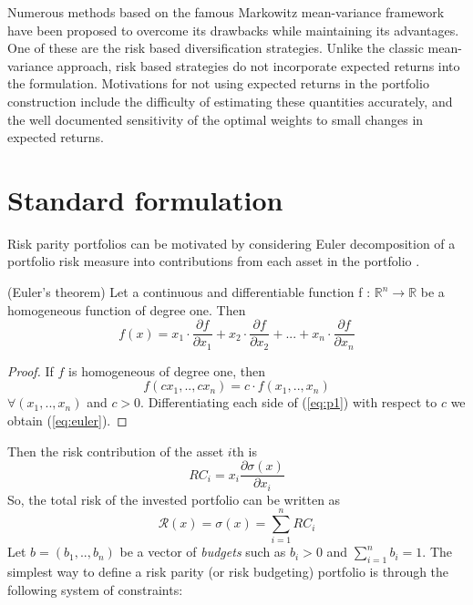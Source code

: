 Numerous methods based on the famous Markowitz mean-variance framework have been proposed to overcome its drawbacks while maintaining its advantages. One of these are the risk based diversification strategies. Unlike the classic mean-variance approach, risk based strategies do not incorporate expected returns into the formulation. Motivations for not using expected returns in the portfolio construction include the difficulty of estimating these quantities accurately, and the well documented sensitivity of the optimal weights to small changes in expected returns. 

\section{Standard formulation}
Risk parity portfolios can be motivated by considering Euler decomposition of a portfolio risk measure into contributions from each asset in the portfolio \cite{tutuncu}.
\begin{theorem}
(Euler’s theorem) Let a continuous and differentiable function f : $\mathbb{R}^n \longrightarrow \mathbb{R}$ be a homogeneous function of degree one. Then
\begin{equation}\label{eq:euler}
f(x) = x_1\cdot\frac{\partial f}{\partial x_1} + x_2\cdot\frac{\partial f}{\partial x_2} + ... + x_n\cdot\frac{\partial f}{\partial x_n}
\end{equation}
\end{theorem}
\begin{proof}
If $f$ is homogeneous of degree one, then
\begin{equation}\label{eq:p1}
f(c x_1, .., c x_n) = c \cdot f(x_1, .., x_n)
\end{equation}
$\forall (x_1, .., x_n)$  and  $c > 0$. Differentiating each side of (\ref{eq:p1}) with respect to $c$ we obtain (\ref{eq:euler}).
\end{proof}
Then the risk contribution of the asset $i$th is
\begin{equation}\label{eq:marg}
RC_i = x_i \frac{\partial \sigma(x)}{\partial x_i}
\end{equation} 
So, the total risk of the invested portfolio can be written as
\begin{equation}\label{eq:total}
\mathcal{R}(x) = \sigma(x) = \sum_{i=1}^n RC_i
\end{equation}
Let $b=(b_1,..,b_n)$ be a vector of \textit{budgets} such as $b_i > 0$ and $\sum_{i=1}^n b_i = 1$. The simplest way to define a risk parity \cite{bruder} (or risk budgeting) portfolio is through the following system of constraints:\\
